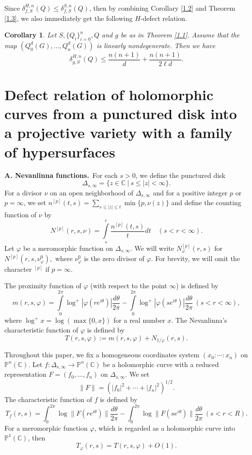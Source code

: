 \documentclass[12pt,article]{amsart}
\newtheorem{corollary}[equation]{Corollary}
\newcommand{\C}{{\mathbb{C}}}
\renewcommand{\P}{{\mathbb{P}}}
\numberwithin{equation}{section}
\begin{document}
Since $ \delta^{H,n}_{f,S}(Q) \le  \delta^{S,n}_{f,S}(Q)$, then by combining Corollary \ref{1.2} and Theorem \ref{1.3}, we also immediately get the following $H$-defect relation.
\begin{corollary}\label{1.6}
Let $S,\{Q_i\}_{i=0}^n,Q$ and $g$ be as in Theorem \ref{1.1}. Assume that the map $(Q_0^d(G),\ldots,Q_n^d(G))$ is linearly nondegenerate. Then we have
$$\delta^{H,n}_{g,S}(Q)\le \frac{n(n+1)}{d}+\frac{n(n+1)}{2\ell d}.$$
\end{corollary}

\section{Defect relation of holomorphic curves from a punctured disk into a projective variety with a family of hypersurfaces}

\noindent
{\bf A. Nevanlinna functions.}\ For each $s>0$, we define the punctured disk
$$\Delta_{s,\infty}=\{z\in\C\ |\ s\le |z|<\infty\}.$$
For a divisor $\nu$ on an open neighborhood of $\Delta_{s,\infty}$ and for a positive integer $p$ or $p= \infty$, we set $n^{[p]}(t,s) =\sum\limits_{s\le |z|\leq t}\min\{p,\nu (z)\}$ and define the counting function of $\nu$ by
$$N^{[p]}(r,s,\nu)=\int\limits_{s}^r \dfrac {n^{[p]}(t,s)}{t}dt \quad (s<r<\infty).$$
Let $\varphi$ be a meromorphic function on $\Delta_{s,\infty}$. We will write $N_{\varphi}^{[p]}(r,s)$ for $N^{[p]}(r,s,\nu^0_{\varphi}),$ where  $\nu^0_\varphi$ is the zero divisor of $\varphi$. For brevity, we will omit the character $^{[p]}$ if $p=\infty$. 

The proximity function of $\varphi$ (with respect to the point $\infty$) is defined by
$$ m(r,s,\varphi)=\int\limits_{0}^{2\pi}\log^+|\varphi(re^{i\theta})|\dfrac{d\theta}{2\pi}-\int\limits_{0}^{2\pi}\log^+|\varphi(se^{i\theta})|\dfrac{d\theta}{2\pi}\ (s<r<\infty),$$
where $\log^+x=\log(\max\{0,x\})$ for a real number $x$. The Nevanlinna's characteristic function of $\varphi$ is defined by
$$ T(r,s,\varphi):=m(r,s,\varphi)+N_{1/\varphi}(r,s).$$

Throughout this paper, we fix a homogeneous coordinates system $(x_0:\cdots :x_n)$ on $\P^n(\C)$. Let $f : \Delta_{s,\infty} \longrightarrow \P^n(\C)$ be a holomorphic curve with a reduced representation $F = (f_0, \ldots,f_n)$ on $\Delta_{s,\infty}$. We set 
$$\|F\|=(|f_0|^2+\cdots+|f_n|^2)^{1/2}.$$
The characteristic function of $f$ is defined by 
$$ T_f(r,s)=\int_{0}^{2\pi}\log\|F(re^{i\theta})\|\dfrac{d\theta}{2\pi}-\int_{0}^{2\pi}\log\|F(se^{i\theta})\|\dfrac{d\theta}{2\pi}\ (s<r<R). $$
For a meromorphic function $\varphi$, which is regarded as a holomorphic curve into $\P^1(\C)$, then
$$ T_\varphi(r,s)=T(r,s,\varphi)+O(1).$$
\end{document}
